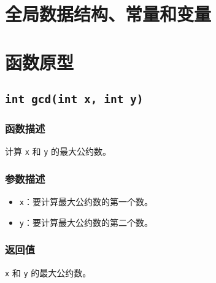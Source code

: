 \documentclass{cdlabreport}
\begin{document}
\section{全局数据结构、常量和变量}

\section{函数原型}

\subsection{\lstinline|int gcd(int x, int y)|}

\subsubsection{函数描述}

计算 \lstinline|x| 和 \lstinline|y| 的最大公约数。

\subsubsection{参数描述}

\begin{itemize}
    \item \lstinline|x|：要计算最大公约数的第一个数。
    \item \lstinline|y|：要计算最大公约数的第二个数。
\end{itemize}

\subsubsection{返回值}

\lstinline|x| 和 \lstinline|y| 的最大公约数。
\end{document}
